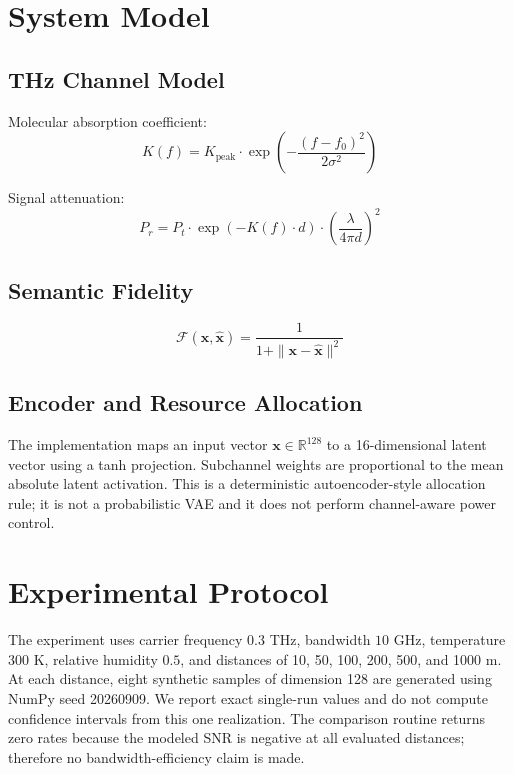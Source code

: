 \documentclass[sigconf]{acmart}
\begin{document}
\section{System Model}

\subsection{THz Channel Model}

Molecular absorption coefficient:
\begin{equation}
K(f) = K_{\text{peak}} \cdot \exp\left(-\frac{(f - f_0)^2}{2\sigma^2}\right)
\end{equation}

Signal attenuation:
\begin{equation}
P_r = P_t \cdot \exp(-K(f) \cdot d) \cdot \left(\frac{\lambda}{4\pi d}\right)^2
\end{equation}

\subsection{Semantic Fidelity}

\begin{equation}
\mathcal{F}(\mathbf{x}, \hat{\mathbf{x}}) = \frac{1}{1 + \|\mathbf{x} - \hat{\mathbf{x}}\|^2}
\end{equation}

\subsection{Encoder and Resource Allocation}

The implementation maps an input vector $\mathbf{x}\in\mathbb{R}^{128}$ to a 16-dimensional latent vector using a tanh projection. Subchannel weights are proportional to the mean absolute latent activation. This is a deterministic autoencoder-style allocation rule; it is not a probabilistic VAE and it does not perform channel-aware power control.

\section{Experimental Protocol}

The experiment uses carrier frequency $0.3$ THz, bandwidth $10$ GHz, temperature $300$ K, relative humidity $0.5$, and distances of 10, 50, 100, 200, 500, and 1000 m. At each distance, eight synthetic samples of dimension 128 are generated using NumPy seed 20260909. We report exact single-run values and do not compute confidence intervals from this one realization. The comparison routine returns zero rates because the modeled SNR is negative at all evaluated distances; therefore no bandwidth-efficiency claim is made.
\end{document}
